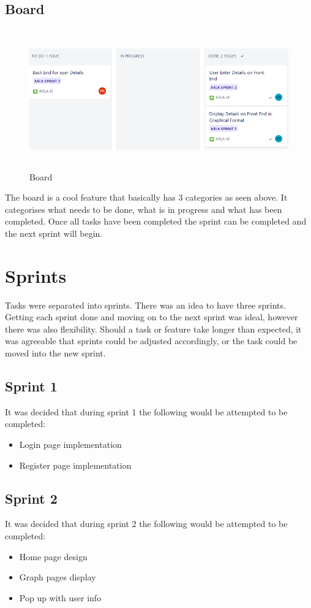 \subsection{Board}
\begin{figure}[h]
    \centering
    \includegraphics[width=15cm, height=6cm]{img/Board.png}
    \caption{Board}
    \label{fig:my_label}
\end{figure}
The board is a cool feature that basically has 3 categories as seen above. It categorises what needs to be done, what is in progress and what has been completed. Once all tasks have been completed the sprint can be completed and the next sprint will begin. 

\section{Sprints}
Tasks were separated into sprints. There was an idea to have three sprints. Getting each sprint done and moving on to the next sprint was ideal, however there was also flexibility. Should a task or feature take longer than expected, it was agreeable that sprints could be adjusted accordingly, or the task could be moved into the new sprint. 

\subsection{Sprint 1}
It was decided that during sprint 1 the following would be attempted to be completed:
\begin{itemize}
\item Login page implementation
\item Register page implementation
\end{itemize}


\subsection{Sprint 2}
It was decided that during sprint 2 the following would be attempted to be completed:
\begin{itemize}
\item Home page design
\item Graph pages display
\item Pop up with user info
\end{itemize}

